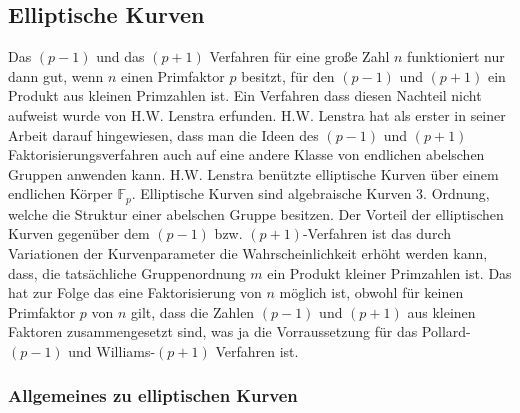 \documentclass[a4paper,11pt]{article}
\begin{document}
\subsection{Elliptische Kurven}

Das $(p-1)$ und das $(p+1)$ Verfahren für eine große Zahl $n$ funktioniert
nur dann gut, wenn $n$ einen Primfaktor $p$ besitzt, für den $(p-1)$ und $(p+1)$
ein Produkt aus kleinen Primzahlen ist. Ein Verfahren dass diesen Nachteil nicht
aufweist wurde von H.W. Lenstra erfunden. H.W. Lenstra hat als erster in seiner
Arbeit darauf hingewiesen, dass man die Ideen des $(p-1)$ und $(p+1)$ 
Faktorisierungsverfahren auch auf eine andere Klasse von endlichen abelschen
Gruppen anwenden kann. H.W. Lenstra benützte elliptische Kurven über einem
endlichen Körper ${\mathbb F}_p$. Elliptische Kurven sind algebraische Kurven
$3$. Ordnung, welche die Struktur einer abelschen Gruppe besitzen. Der Vorteil
der elliptischen Kurven gegenüber dem $(p-1)$ bzw. $(p+1)$-Verfahren ist das
durch Variationen der Kurvenparameter die Wahrscheinlichkeit erhöht werden kann,
 dass, die tatsächliche Gruppenordnung $m$ ein Produkt kleiner Primzahlen ist. 
Das hat zur Folge das eine Faktorisierung von $n$ möglich ist, obwohl für 
keinen Primfaktor $p$ von $n$ gilt, dass die Zahlen $(p-1)$ und $(p+1)$ aus 
kleinen Faktoren zusammengesetzt sind, was ja die Vorraussetzung für das 
Pollard-$(p-1)$ und Williams-$(p+1)$ Verfahren ist.

\subsubsection*{Allgemeines zu elliptischen Kurven}
\end{document}
